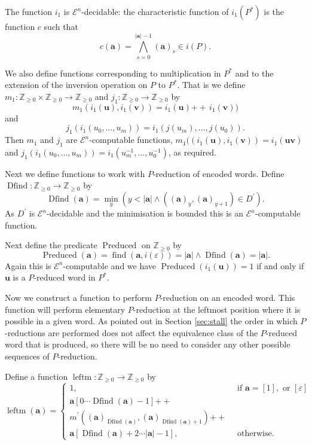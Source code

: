 \documentclass[a4paper]{article}
\newcommand{\grz}[1]{$\mathcal{E}^{#1}$}	%
\newcommand{\ZZ}{\mathbb{Z}}
\newcommand{\maps}{\longrightarrow}
\newcommand\eps{\varepsilon}
\newcommand{\avec}{\mathbf{a}}	%
\newcommand{\uvec}{\mathbf{u}}	%
\newcommand{\vvec}{\mathbf{v}}	%
\newcommand{\concat}{\ensuremath{+\!\!\!\!+\,}}	%
\newcommand{\find}{\operatorname{find}}
\newcommand{\Dfind}{\operatorname{Dfind}}
\newcommand{\Preduced}{\operatorname{Preduced}}
\newcommand{\leftm}{\operatorname{leftm}}
\theoremstyle{plain}
\theoremstyle{definition}
\begin{document}
The function $i_1$ is 
 \grz{n}-decidable: the characteristic function of $i_1(P^*)$ is the function 
$c$ such that 
\[c(\avec)=\displaystyle{\bigwedge_{s=0}^{|\avec|-1}}(\avec)_s \in i(P).\]  

We also define functions corresponding to multiplication in $P^*$  and to the extension of the inversion
operation on $P$ to $P^*$. That is we define $m_1:\ZZ_{\geq 0}\times\ZZ_{\geq 0}\maps \ZZ_{\geq 0}$ and $j_1:\ZZ_{\geq 0}\maps \ZZ_{\geq 0}$ by
\begin{equation}\label{eq:mmonoid}
m_1(i_1(\uvec),i_1(\vvec))=i_1(\uvec)\concat i_1(\vvec)) 
\end{equation}
and 
\begin{equation}\label{eq:jmonoid}
j_1(i_1(u_0,\ldots, u_m))=i_1(j(u_m),\ldots ,j(u_0)). 
\end{equation}
Then $m_1$ and $j_1$ are \grz{n}-computable functions, $m_1((i_1(\uvec),i_1(\vvec))=i_1(\uvec\vvec)$ 
and $j_1(i_1(u_0,\ldots, u_m))=i_1(u_m^{-1},\ldots , u_0^{-1})$, as required.

Next we define functions to work with $P$-reduction of encoded words.
Define $\Dfind:\ZZ_{\geq 0}\maps \ZZ_{\geq 0}$ by 
\begin{equation}\label{eq:Dfind}
\Dfind(\avec)=\min_y(y<|\avec|\wedge ((\avec)_y,(\avec)_{y+1})\in D^\prime).
\end{equation}
As $D^\prime$ is \grz{n}-decidable and the minimisation is bounded this is
an \grz{n}-computable function. 

Next define the predicate $\Preduced$ on $\ZZ_{\geq 0}$ by
\begin{equation}\label{eq:Preduced}
\Preduced(\avec)=\find(\avec,i(\eps))=|\avec|\wedge \Dfind(\avec)=|\avec|.
\end{equation} 
Again this is \grz{n}-computable and we have $\Preduced(i_1(\uvec))=1$ if and 
only if $\uvec$ is a $P$-reduced word in $P^\ast$. 

Now we construct a function to perform $P$-reduction on an encoded word. This
function will perform elementary $P$-reduction at the leftmost position where
it is possible in a given word. As pointed out in Section \ref{sec:stall} the
order in which $P$-reductions are performed does not affect the equivalence
class of the $P$-reduced word that is produced, so there will be no need to
consider any other possible  sequences of $P$-reduction. 

Define a function $\leftm:\ZZ_{\geq 0}\maps \ZZ_{\geq 0}$ by
\begin{equation}\label{eq:leftm}
\leftm(\avec)=
\left\{
\begin{array}{ll}
1,& \textrm{ if } \avec = [1], \textrm{ or } [\eps]\\
\avec[0\cdots \Dfind(\avec)-1]\concat &\\
m^\prime((\avec)_{\Dfind(\avec)},(\avec)_{\Dfind(\avec)+1})\concat&\\
\avec[\Dfind(\avec)+2\cdots |\avec|-1] ,& \textrm{ otherwise. } 
\end{array}
\right.
\end{equation}
\end{document}
